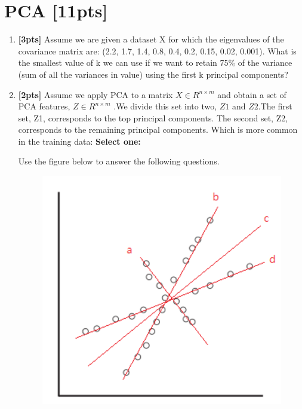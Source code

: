 \section{PCA [11pts]}

\begin{enumerate}
    \item \textbf{[3pts]} Assume we are given a dataset X for which the eigenvalues of the covariance matrix are:
    (2.2, 1.7, 1.4, 0.8, 0.4, 0.2, 0.15, 0.02, 0.001). What is the smallest value of k we can use if we want to retain 75\% of the variance (sum of all the variances in value) using the first k principal components?
    
    \begin{tcolorbox}[fit,height=1cm, width=2cm, blank, borderline={1pt}{-2pt},nobeforeafter]
    \end{tcolorbox}
    
    
    \item \textbf{[2pts]} Assume we apply PCA to a matrix $X \in R^{n \times m}$ and obtain a set of PCA features, $Z \in R^{n \times m}$ .We divide this set into two, $Z1$ and $Z2$.The first set, Z1, corresponds to the top principal components. The second set, Z2, corresponds to the remaining principal components. Which is more common in the training data:
    \textbf{Select one:}
    
\clearpage    
Use the figure below to answer the following questions.    
    \begin{figure}[H]
    \centering
    \includegraphics[width=0.5\linewidth]{figures/pca1.png}
    \end{figure}
    

\end{enumerate}
